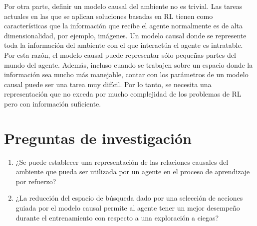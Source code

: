 Por otra parte, definir un modelo causal del ambiente no es trivial.
Las tareas actuales en las que se aplican soluciones 
basadas en RL tienen como características que la información
que recibe el agente normalmente es de alta dimensionalidad, por 
ejemplo, imágenes. Un modelo causal donde se represente toda
la información del ambiente con el que interactúa el agente
es intratable. 
Por esta razón, el modelo causal puede representar sólo pequeñas partes del mundo del agente. Además, incluso cuando se trabajen sobre un espacio donde la información sea 
mucho más manejable, contar con los parámetros de un modelo causal puede ser una tarea muy difícil. Por lo tanto, se necesita una representación que no exceda por mucho complejidad de los problemas de RL pero con información suficiente.








\section{Preguntas de investigación}

\begin{enumerate}
    \item ¿Se puede establecer una representación de las relaciones causales
del ambiente que pueda ser utilizada por un agente en el proceso
de aprendizaje por refuerzo?
    \item ¿La reducción del espacio de búsqueda dado por una selección de acciones guiada por el modelo causal permite al agente tener un mejor desempeño durante el entrenamiento con respecto a una exploración a ciegas?
\end{enumerate}
